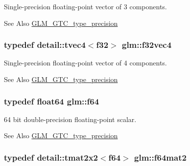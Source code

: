 Single-\/precision floating-\/point vector of 3 components. 

\begin{DoxySeeAlso}{See Also}
\hyperlink{group__gtc__type__precision}{G\-L\-M\-\_\-\-G\-T\-C\-\_\-type\-\_\-precision} 
\end{DoxySeeAlso}
\hypertarget{group__gtc__type__precision_ga87b80bb1fb0fba6433912ab9aec05f2c}{
\subsubsection[{f32vec4}]{\setlength{\rightskip}{0pt plus 5cm}typedef detail\-::tvec4$<$f32$>$ {\bf glm\-::f32vec4}}}\label{group__gtc__type__precision_ga87b80bb1fb0fba6433912ab9aec05f2c}


Single-\/precision floating-\/point vector of 4 components. 

\begin{DoxySeeAlso}{See Also}
\hyperlink{group__gtc__type__precision}{G\-L\-M\-\_\-\-G\-T\-C\-\_\-type\-\_\-precision} 
\end{DoxySeeAlso}
\hypertarget{group__gtc__type__precision_ga2bba392e555124b36cde6abba349bab3}{
\subsubsection[{f64}]{\setlength{\rightskip}{0pt plus 5cm}typedef float64 {\bf glm\-::f64}}}\label{group__gtc__type__precision_ga2bba392e555124b36cde6abba349bab3}


64 bit double-\/precision floating-\/point scalar. 

\begin{DoxySeeAlso}{See Also}
\hyperlink{group__gtc__type__precision}{G\-L\-M\-\_\-\-G\-T\-C\-\_\-type\-\_\-precision} 
\end{DoxySeeAlso}
\hypertarget{group__gtc__type__precision_ga9df0911951345cd94f86e7d3895e6941}{
\subsubsection[{f64mat2}]{\setlength{\rightskip}{0pt plus 5cm}typedef detail\-::tmat2x2$<$f64$>$ {\bf glm\-::f64mat2}}}\label{group__gtc__type__precision_ga9df0911951345cd94f86e7d3895e6941}



